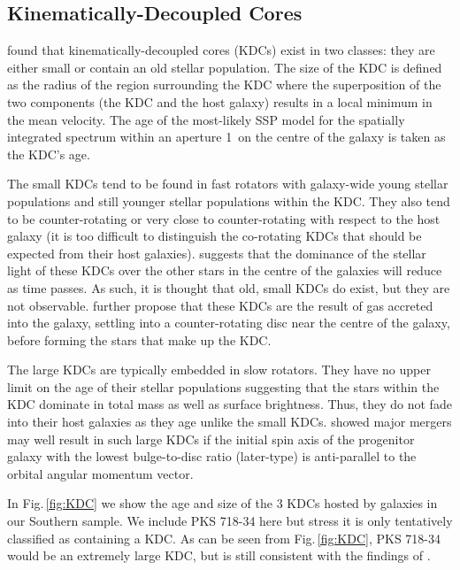 


	\subsection{Kinematically-Decoupled Cores}
		\label{subsec:popKDC}

		\citet{Kuntschner2010} found that kinematically-decoupled cores (KDCs) exist in two classes: they are either small or contain an old stellar population. The size of the KDC is defined as the radius of the region surrounding the KDC where the superposition of the two components (the KDC and the host galaxy) results in a local minimum in the mean velocity. The age of the most-likely SSP model for the spatially integrated spectrum within an aperture 1\arcsec\ on the centre of the galaxy is taken as the KDC's age.

		The small KDCs tend to be found in fast rotators with galaxy-wide young stellar populations and still younger stellar populations within the KDC. They also tend to be counter-rotating or very close to counter-rotating with respect to the host galaxy (it is too difficult to distinguish the co-rotating KDCs that should be expected from their host galaxies). \citet{Kuntschner2010} suggests that the dominance of the stellar light of these KDCs over the other stars in the centre of the galaxies will reduce as time passes. As such, it is thought that old, small KDCs do exist, but they are not observable. \citet{Kuntschner2010} further propose that these KDCs are the result of gas accreted into the galaxy, settling into a counter-rotating disc near the centre of the galaxy, before forming the stars that make up the KDC. 

		The large KDCs are typically embedded in slow rotators. They have no upper limit on the age of their stellar populations suggesting that the stars within the KDC dominate in total mass as well as surface brightness. Thus, they do not fade into their host galaxies as they age unlike the small KDCs. \citet{Bois2011} showed major mergers may well result in such large KDCs if the initial spin axis of the progenitor galaxy with the lowest bulge-to-disc ratio (later-type) is anti-parallel to the orbital angular momentum vector. 

		In Fig.\,\ref{fig:KDC} we show the age and size of the 3 KDCs hosted by galaxies in our Southern sample. We include PKS 718-34 here but stress it is only tentatively classified as containing a KDC. As can be seen from Fig.\,\ref{fig:KDC}, PKS 718-34 would be an extremely large KDC, but is still consistent with the findings of \citet{Kuntschner2010}.

